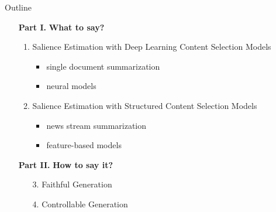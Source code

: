 \begin{frame}{Outline}
    \begin{itemize}
        \item[\textbf{Part I.}] \textbf{What to say?}
        \begin{enumerate}
            \item Salience Estimation with Deep Learning Content Selection
                    Models
        \begin{itemize}
            \item single document summarization
            \item neural models
        \end{itemize}
                \vspace{10pt}
            \item Salience Estimation with Structured Content Selection Models 
        \begin{itemize}
            \item news stream summarization
            \item feature-based models
        \end{itemize}
        \end{enumerate}
        \vspace{10pt}
    \item[\textbf{Part II.}] \textbf{How to say it?}
        \begin{enumerate}
            \item[3.] Faithful Generation
                \vspace{10pt}
            \item[4.] Controllable Generation
        \end{enumerate}
    \end{itemize}

\end{frame}
